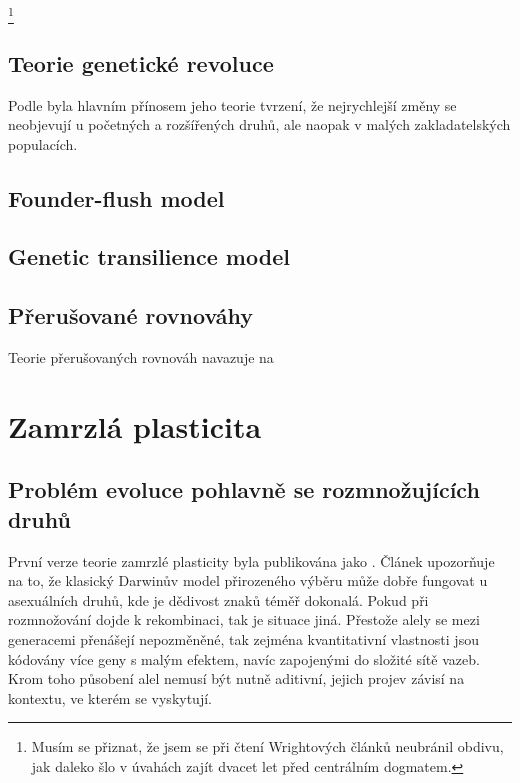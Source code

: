 \footnote{Musím se přiznat, že jsem se při čtení Wrightových článků neubránil obdivu, jak daleko šlo v úvahách
zajít dvacet let před centrálním dogmatem.}

\subsection{Teorie genetické revoluce}

\citep{mayr1954change}

Podle \citep[str. 140]{mayr1989} byla hlavním přínosem jeho teorie tvrzení, že nejrychlejší změny se neobjevují u
početných a rozšířených druhů, ale naopak v malých zakladatelských populacích.


\subsection{Founder-flush model}

\subsection{Genetic transilience model}

\subsection{Přerušované rovnováhy}

Teorie přerušovaných rovnováh navazuje na

\section{Zamrzlá plasticita}

\subsection{Problém evoluce pohlavně se rozmnožujících druhů}

První verze teorie zamrzlé plasticity byla publikována jako \citet{flegr1998origin}. Článek upozorňuje na to, že
klasický Darwinův model přirozeného výběru může dobře fungovat u asexuálních druhů, kde je dědivost znaků téměř
dokonalá.
Pokud při rozmnožování dojde k rekombinaci, tak je situace jiná. Přestože alely se mezi generacemi přenášejí
nepozměněné, tak zejména kvantitativní vlastnosti jsou kódovány více geny s malým efektem, navíc zapojenými do
složité sítě vazeb. Krom toho působení alel nemusí být nutně aditivní, jejich projev závisí na kontextu,
ve kterém se vyskytují.

